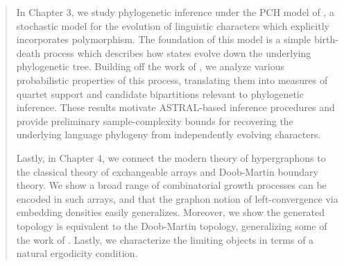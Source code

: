 \begin{abstract}
\noindent In Chapter 3, we study phylogenetic inference under the 
PCH model of \cite{canby2024_polymorphism_linguistic_phylogenetics}, a stochastic model for the
evolution of linguistic characters which explicitly incorporates polymorphism. 
The foundation of this model is a simple birth-death process which describes how 
states evolve down the underlying phylogenetic tree. Building off the work of \cite{evans2026_canby_identifiability}, 
we analyze various probabilistic properties of this process, translating them into measures of quartet support
and candidate bipartitions relevant to phylogenetic inference. These results motivate ASTRAL-based 
inference procedures and provide preliminary sample-complexity bounds for recovering 
the underlying language phylogeny from independently evolving characters.

Lastly, in Chapter 4, we connect the modern theory of hypergraphons to the classical theory of exchangeable arrays
and Doob-Martin boundary theory. We show a broad range of combinatorial growth processes can be encoded in
such arrays, and that the graphon notion of left-convergence via embedding densities easily generalizes. Moreover,
we show the generated topology is equivalent to the Doob-Martin topology, generalizing some of the work of
\cite{grubel2015_persisting_randomness_graphs_search_trees,grubel2023_ranks_copulas_permutons}. Lastly, we
characterize the limiting objects in terms of a natural ergodicity condition.

\end{abstract}
